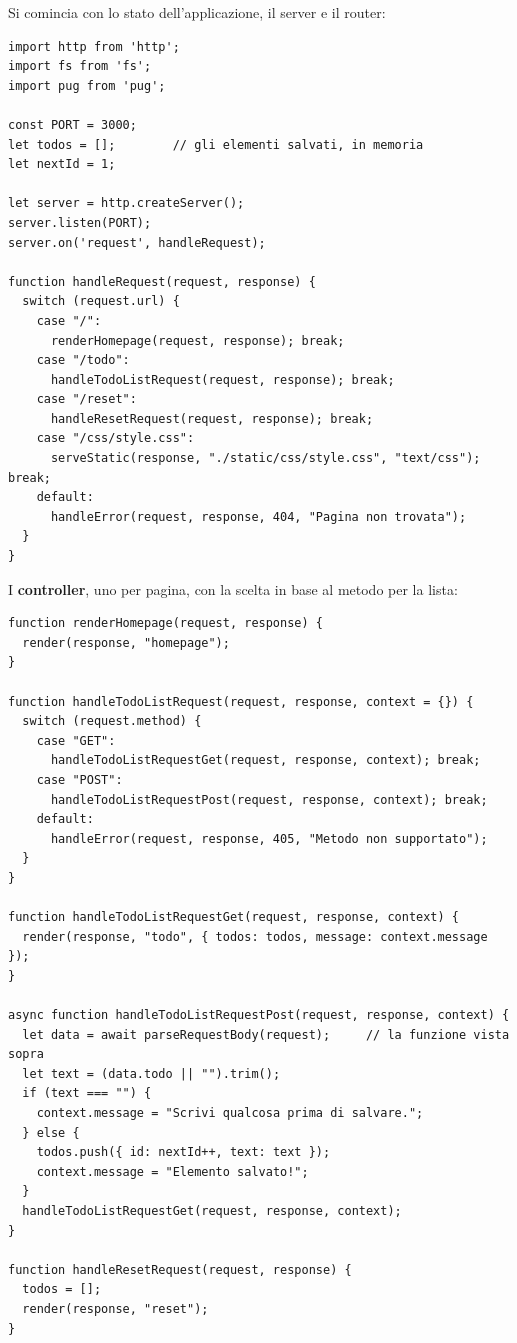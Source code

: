 Si comincia con lo stato dell'applicazione, il server e il router:

\begin{lstlisting}[style=js, name=app.js]
import http from 'http';
import fs from 'fs';
import pug from 'pug';

const PORT = 3000;
let todos = [];        // gli elementi salvati, in memoria
let nextId = 1;

let server = http.createServer();
server.listen(PORT);
server.on('request', handleRequest);

function handleRequest(request, response) {
  switch (request.url) {
    case "/":
      renderHomepage(request, response); break;
    case "/todo":
      handleTodoListRequest(request, response); break;
    case "/reset":
      handleResetRequest(request, response); break;
    case "/css/style.css":
      serveStatic(response, "./static/css/style.css", "text/css"); break;
    default:
      handleError(request, response, 404, "Pagina non trovata");
  }
}
\end{lstlisting}

I \textbf{controller}, uno per pagina, con la scelta in base al metodo per la
lista:

\begin{lstlisting}[style=js, name=app.js, firstnumber=last]
function renderHomepage(request, response) {
  render(response, "homepage");
}

function handleTodoListRequest(request, response, context = {}) {
  switch (request.method) {
    case "GET":
      handleTodoListRequestGet(request, response, context); break;
    case "POST":
      handleTodoListRequestPost(request, response, context); break;
    default:
      handleError(request, response, 405, "Metodo non supportato");
  }
}

function handleTodoListRequestGet(request, response, context) {
  render(response, "todo", { todos: todos, message: context.message });
}

async function handleTodoListRequestPost(request, response, context) {
  let data = await parseRequestBody(request);     // la funzione vista sopra
  let text = (data.todo || "").trim();
  if (text === "") {
    context.message = "Scrivi qualcosa prima di salvare.";
  } else {
    todos.push({ id: nextId++, text: text });
    context.message = "Elemento salvato!";
  }
  handleTodoListRequestGet(request, response, context);
}

function handleResetRequest(request, response) {
  todos = [];
  render(response, "reset");
}
\end{lstlisting}


